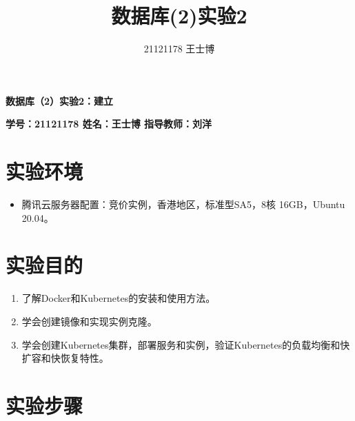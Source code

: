 \documentclass{article}
\title{\Huge 数据库(2)实验2}
\author{21121178 王士博}
\begin{document}
\begin{center}
    \textbf{\huge 数据库（2）实验2：建立}
\end{center}
\begin{center}
    \textbf{\large \textbf{学号：21121178 \quad 姓名：王士博 \quad 指导教师：刘洋}}
\end{center}
\hrulefill
\section{实验环境}
\begin{itemize}
    \item 腾讯云服务器配置：竞价实例，香港地区，标准型SA5，8核 16GB，Ubuntu 20.04。
\end{itemize}
\section{实验目的}
\begin{enumerate}
    \item 了解Docker和Kubernetes的安装和使用方法。
    \item 学会创建镜像和实现实例克隆。
    \item 学会创建Kubernetes集群，部署服务和实例，验证Kubernetes的负载均衡和快扩容和快恢复特性。
\end{enumerate}
\section{实验步骤}
\end{document}
